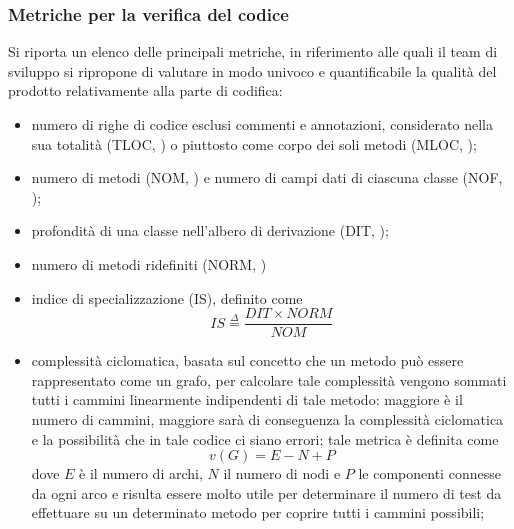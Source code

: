 \subsubsection{Metriche per la verifica del codice}\label{sec:metrics}

Si riporta un elenco delle principali metriche, in riferimento alle quali il team di sviluppo si ripropone di valutare in modo univoco e quantificabile la qualità del prodotto relativamente alla parte di codifica:

\begin{itemize}
  \item numero di righe di codice esclusi commenti e annotazioni, considerato nella sua totalità (TLOC, ) o piuttosto come corpo dei soli metodi (MLOC, );
  \item numero di metodi (NOM, ) e numero di campi dati di ciascuna classe (NOF, );
  \item profondità di una classe nell'albero di derivazione (DIT, );
  \item numero di metodi ridefiniti (NORM, )
  \item indice di specializzazione (IS), definito come \[
  IS \stackrel{\Delta}{=} \frac{DIT \times NORM}{NOM}
  \]
  \item complessità ciclomatica, basata sul concetto che un metodo può essere rappresentato come un grafo, per calcolare tale complessità vengono sommati tutti i cammini linearmente indipendenti di tale metodo: maggiore è il numero di cammini, maggiore sarà di conseguenza la complessità ciclomatica e la possibilità che in tale codice ci siano errori; tale metrica è definita come
  \[v(G)=E-N+P\]
dove $E$ è il numero di archi, $N$ il numero di nodi e $P$ le componenti connesse da ogni arco e risulta essere molto utile per determinare il numero di test da effettuare su un determinato metodo per coprire tutti i cammini possibili;


\end{itemize}
